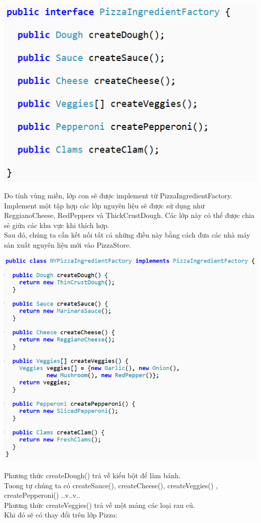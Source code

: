 \begin{center}
	\includegraphics{GALLEYS/images/chapter5/images10}
\end{center}
Do tính vùng miền, lớp con sẽ được implement từ PizzaIngredientFactory.\\
Implement một tập hợp các lớp nguyên liệu sẽ được sử dụng như ReggianoCheese, RedPeppers và ThickCrustDough. Các lớp này có thể được chia sẻ giữa các khu vực khi thích hợp. \\
Sau đó, chúng ta cần kết nối tất cả những điều này bằng cách đưa các nhà máy sản xuất nguyên liệu mới vào PizzaStore.\\


\begin{center}
	\includegraphics{GALLEYS/images/chapter5/images11}
\end{center}
Phương thức createDough() trả về kiểu bột để làm bánh.\\
Tuong tự chúng ta có createSauce(), createCheese(), createVeggies() , createPepperoni() ..v..v..\\
Phương thức createVeggies() trả về một mảng các loại rau củ.\\
Khi đó sẽ có thay đổi trên lớp Pizza:\\


